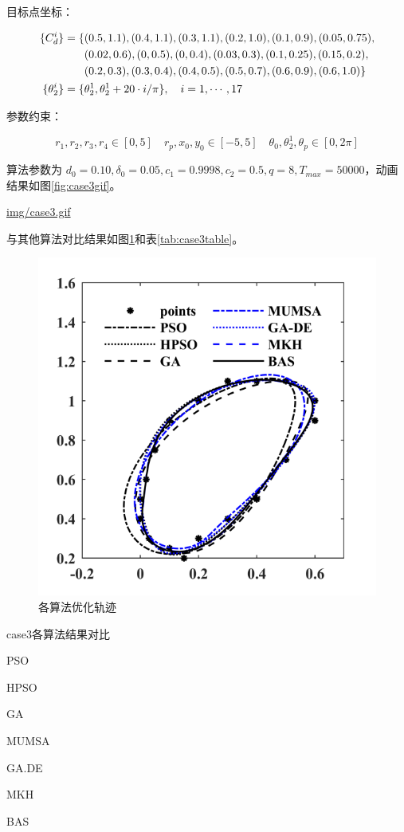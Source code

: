 \documentclass[]{ctexbook}
\theoremstyle{definition}
\theoremstyle{definition}
\theoremstyle{definition}
\theoremstyle{remark}
\begin{document}
目标点坐标：

\begin{align}
\{C_d^i\} = \{&(0.5,1.1),(0.4,1.1),(0.3,1.1),(0.2,1.0),(0.1,0.9),(0.05,0.75), \notag \\
&(0.02,0.6),(0,0.5),(0,0.4),(0.03,0.3),(0.1,0.25),(0.15,0.2), \notag\\
&(0.2,0.3),(0.3,0.4),(0.4,0.5),(0.5,0.7),(0.6,0.9),(0.6,1.0)\} \notag\\
\{\theta_2^i\}=\{&\theta_2^1,\theta_2^1+20\cdot i/\pi\},\quad i = 1,\cdots,17 \notag \\
\end{align}

参数约束：

\[
r_1,r_2,r_3,r_4\in[0,5]\quad r_p,x_0,y_0\in[-5,5]\quad \theta_0,\theta_2^1,\theta_p\in[0,2\pi]
\]

算法参数为
\(d_0 = 0.10,\delta_0=0.05,c_1=0.9998,c_2=0.5,q=8,T_{max}=50000\)，动画结果如图\ref{fig:case3gif}。

\url{img/case3.gif}

与其他算法对比结果如图\ref{fig:case3png}和表\ref{tab:case3table}。

\begin{figure}

{\centering \includegraphics[width=0.5\linewidth]{img/case3png} 

}

\caption{各算法优化轨迹}\label{fig:case3png}
\end{figure}

\label{tab:case3table}case3各算法结果对比

PSO

HPSO

GA

MUMSA

GA.DE

MKH

BAS
\end{document}
